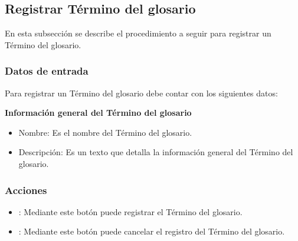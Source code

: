 \subsection{Registrar Término del glosario}
En esta subsección se describe el procedimiento a seguir para registrar un Término del glosario.

\subsubsection{Datos de entrada}
\begin{description}
	\item Para registrar un Término del glosario debe contar con los siguientes datos: \hspace{10pt}
	\begin{description}
	    \item \textbf{Información general del Término del glosario}
	    \begin{itemize}
		  \item Nombre: Es el nombre del Término del glosario.
		  \item Descripción: Es un texto que detalla la información general del Término del glosario.
	    \end{itemize}
	 \end{description}
\end{description}

\subsubsection{Acciones}
\begin{itemize}
 \item {}: Mediante este botón puede registrar el Término del glosario.
 \item {}: Mediante este botón puede cancelar el registro del Término del glosario.
\end{itemize}
	
	
